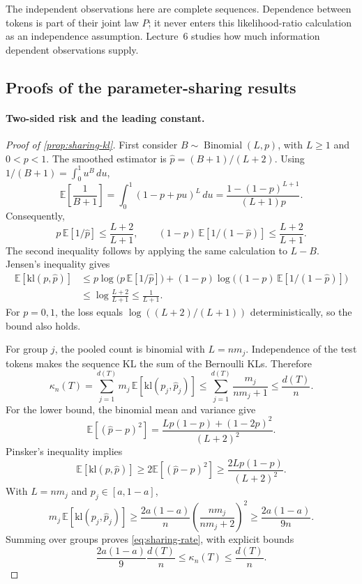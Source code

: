 \documentclass[11pt,twoside]{article}
\newcommand{\E}{\mathbb E}
\newcommand{\kl}{\mathrm{kl}}
\theoremstyle{definition}
\theoremstyle{remark}
\begin{document}
The independent observations here are complete sequences. Dependence
between tokens is part of their joint law \(P\); it never enters this
likelihood-ratio calculation as an independence assumption.
Lecture~6 studies how much information dependent observations supply.

\subsection{Proofs of the parameter-sharing results}
\label{app:growing-horizon}

\paragraph{Two-sided risk and the leading constant.}
\sharingrisk*

\begin{proof}[Proof of \cref{prop:sharing-kl}]
First consider \(B\sim\operatorname{Binomial}(L,p)\), with
\(L\ge1\) and \(0<p<1\).
The smoothed estimator is \(\widehat p=(B+1)/(L+2)\).
Using \(1/(B+1)=\int_0^1u^B\,du\),
\[
 \E\!\left[\frac1{B+1}\right]
 =\int_0^1(1-p+pu)^L\,du
 =\frac{1-(1-p)^{L+1}}{(L+1)p}.
\]
Consequently,
\[
 p\,\E[1/\widehat p]\le\frac{L+2}{L+1},
 \qquad
 (1-p)\,\E[1/(1-\widehat p)]\le\frac{L+2}{L+1}.
\]
The second inequality follows by applying the same calculation to
\(L-B\). Jensen's inequality gives
\begin{align*}
 \E[\kl(p,\widehat p)]
 &\le p\log\!\bigl(p\,\E[1/\widehat p]\bigr)
 +(1-p)\log\!\bigl((1-p)\,\E[1/(1-\widehat p)]\bigr)\\
 &\le\log\frac{L+2}{L+1}\le\frac1{L+1}.
\end{align*}
For \(p=0,1\), the loss equals \(\log((L+2)/(L+1))\)
deterministically, so the bound also holds.

For group \(j\), the pooled count is binomial with \(L=nm_j\).
Independence of the test tokens makes the sequence KL the sum of
the Bernoulli KLs. Therefore
\[
 \kappa_n(T)
 =\sum_{j=1}^{d(T)}m_j\,\E[\kl(p_j,\widehat p_j)]
 \le\sum_{j=1}^{d(T)}\frac{m_j}{nm_j+1}
 \le\frac{d(T)}n.
\]
For the lower bound, the binomial mean and variance give
\[
 \E[(\widehat p-p)^2]
 =\frac{Lp(1-p)+(1-2p)^2}{(L+2)^2}.
\]
Pinsker's inequality implies
\[
 \E[\kl(p,\widehat p)]
 \ge2\E[(\widehat p-p)^2]
 \ge\frac{2Lp(1-p)}{(L+2)^2}.
\]
With \(L=nm_j\) and \(p_j\in[a,1-a]\),
\[
 m_j\,\E[\kl(p_j,\widehat p_j)]
 \ge\frac{2a(1-a)}n\left(\frac{nm_j}{nm_j+2}\right)^2
 \ge\frac{2a(1-a)}{9n}.
\]
Summing over groups proves \cref{eq:sharing-rate}, with explicit bounds
\[
 \frac{2a(1-a)}9\frac{d(T)}n
 \le\kappa_n(T)\le\frac{d(T)}n.
\]


\end{proof}
\end{document}
